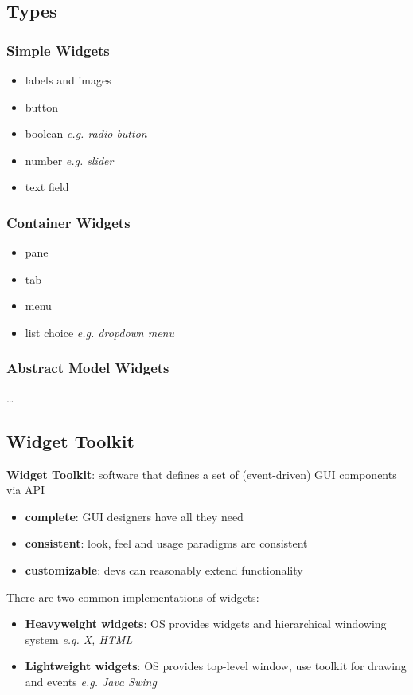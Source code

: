 \documentclass[]{article}
\theoremstyle{definition}
\begin{document}
				\subsection{Types}
					\subsubsection{Simple Widgets}
						\begin{itemize}
							\item labels and images
							\item button
							\item boolean \textit{e.g. radio button}
							\item number \textit{e.g. slider} 	
							\item text field
						\end{itemize}
					\subsubsection{Container Widgets}
					\begin{itemize}
						\item pane
						\item tab
						\item menu
						\item list choice \textit{e.g. dropdown menu}
					\end{itemize}
					\subsubsection{Abstract Model Widgets}
						\dots
				\subsection{Widget Toolkit}
					\textbf{Widget Toolkit}: software that defines a set of (event-driven) GUI components via API 
					\begin{itemize}
						\item \textbf{complete}: GUI designers have all they need
						\item \textbf{consistent}: look, feel and usage paradigms are consistent
						\item \textbf{customizable}: devs can reasonably extend functionality
					\end{itemize}
					There are two common implementations of widgets:
					\begin{itemize}
						\item \textbf{Heavyweight widgets}: OS provides widgets and hierarchical windowing system \textit{e.g. X, HTML}
						\item \textbf{Lightweight widgets}: OS provides top-level window, use toolkit for drawing and events \textit{e.g. Java Swing}
					\end{itemize}
\end{document}
